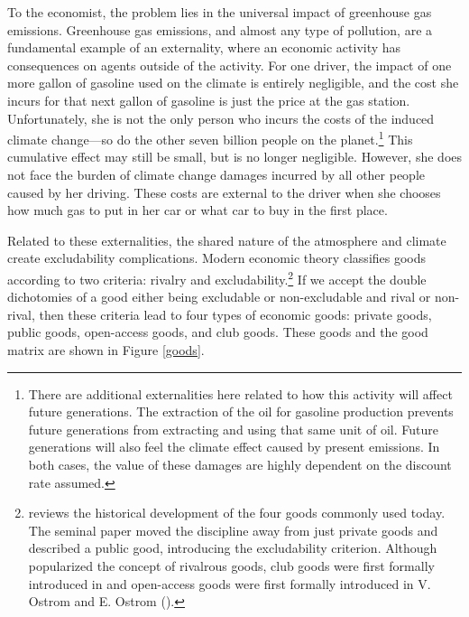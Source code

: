 To the economist, the problem lies in the universal impact of greenhouse gas emissions. Greenhouse gas emissions, and almost any type of pollution, are a fundamental example of an externality, where an economic activity has consequences on agents outside of the activity. For one driver, the impact of one more gallon of gasoline used on the climate is entirely negligible, and the cost she incurs for that next gallon of gasoline is just the price at the gas station. Unfortunately, she is not the only person who incurs the costs of the induced climate change---so do the other seven billion people on the planet.\footnote{There are additional externalities here related to how this activity will affect future generations. The extraction of the oil for gasoline production prevents future generations from extracting and using that same unit of oil. Future generations will also feel the climate effect caused by present emissions. In both cases, the value of these damages are highly dependent on the discount rate assumed.} This cumulative effect may still be small, but is no longer negligible. However, she does not face the burden of climate change damages incurred by all other people caused by her driving. These costs are external to the driver when she chooses how much gas to put in her car or what car to buy in the first place. 

Related to these externalities, the shared nature of the atmosphere and climate create excludability complications. Modern economic theory classifies goods according to two criteria: rivalry and excludability.\footnote{ \cite{ostrom2010beyond} reviews the historical development of the four goods commonly used today. The seminal paper \cite{samuelson1954pure} moved the discipline away from just private goods and described a public good, introducing the excludability criterion. Although \cite{hardin1968tragedy} popularized the concept of rivalrous goods, club goods were first formally introduced in \cite{buchanan1965economic} and open-access goods were first formally introduced in V. Ostrom and E. Ostrom (\citeyear{ostrom1977public}).} If we accept the double dichotomies of a good either being excludable or non-excludable and rival or non-rival, then these criteria lead to four types of economic goods: private goods, public goods, open-access goods, and club goods. These goods and the good matrix are shown in Figure \ref{goods}.

